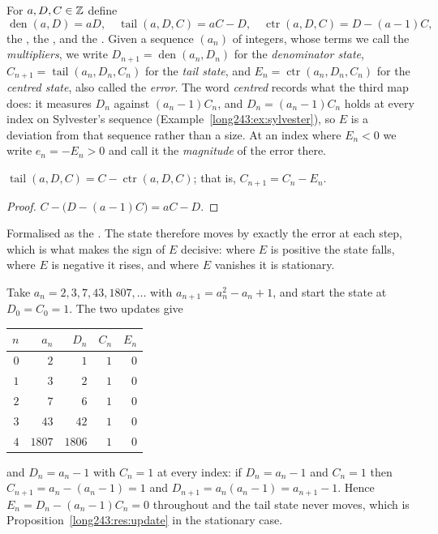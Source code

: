 \documentclass[11pt]{article}
\newcommand{\den}{\operatorname{den}}
\newcommand{\tail}{\operatorname{tail}}
\newcommand{\ctr}{\operatorname{ctr}}
\begin{document}
For $a,D,C\in\mathbb{Z}$ define
\[
 \den(a,D)=aD,
 \quad
 \tail(a,D,C)=aC-D,
 \quad
 \ctr(a,D,C)=D-(a-1)C ,
\]
the
, the
,
and the
.
Given a sequence $(a_n)$ of integers, whose terms we call the
\emph{multipliers}, we write $D_{n+1}=\den(a_n,D_n)$ for the \emph{denominator
state}, $C_{n+1}=\tail(a_n,D_n,C_n)$ for the \emph{tail state}, and
$E_n=\ctr(a_n,D_n,C_n)$ for the \emph{centred state}, also called the
\emph{error}.  The word \emph{centred} records what the third map does: it
measures $D_n$ against $(a_n-1)C_n$, and $D_n=(a_n-1)C_n$ holds at every index
on Sylvester's sequence (Example~\ref{long243:ex:sylvester}), so $E$ is a deviation
from that sequence rather than a size.  At an index where $E_n<0$ we write
$e_n=-E_n>0$ and call it the \emph{magnitude} of the error there.

\begin{proposition}\label{long243:res:update}
$\tail(a,D,C)=C-\ctr(a,D,C)$; that is, $C_{n+1}=C_n-E_n$.
\end{proposition}

\begin{proof}
$C-\bigl(D-(a-1)C\bigr)=aC-D$.
\end{proof}

\noindent Formalised as the
.  The state therefore moves by exactly the error at each step, which is
what makes the sign of $E$ decisive: where $E$ is positive the state falls,
where $E$ is negative it rises, and where $E$ vanishes it is stationary.

\begin{example}\label{long243:ex:sylvester}
Take $a_n=2,3,7,43,1807,\ldots$ with $a_{n+1}=a_n^{2}-a_n+1$, and start the
state at $D_0=C_0=1$.  The two updates give

\begin{center}
\begin{tabular}{@{}rrrrr@{}}
\toprule
$n$ & $a_n$ & $D_n$ & $C_n$ & $E_n$\\
\midrule
$0$ & $2$ & $1$ & $1$ & $0$\\
$1$ & $3$ & $2$ & $1$ & $0$\\
$2$ & $7$ & $6$ & $1$ & $0$\\
$3$ & $43$ & $42$ & $1$ & $0$\\
$4$ & $1807$ & $1806$ & $1$ & $0$\\
\bottomrule
\end{tabular}
\end{center}

\noindent and $D_n=a_n-1$ with $C_n=1$ at every index: if $D_n=a_n-1$ and
$C_n=1$ then $C_{n+1}=a_n-(a_n-1)=1$ and $D_{n+1}=a_n(a_n-1)=a_{n+1}-1$.
Hence $E_n=D_n-(a_n-1)C_n=0$ throughout and the tail state never moves, which
is Proposition~\ref{long243:res:update} in the stationary case.
\end{example}
\end{document}
